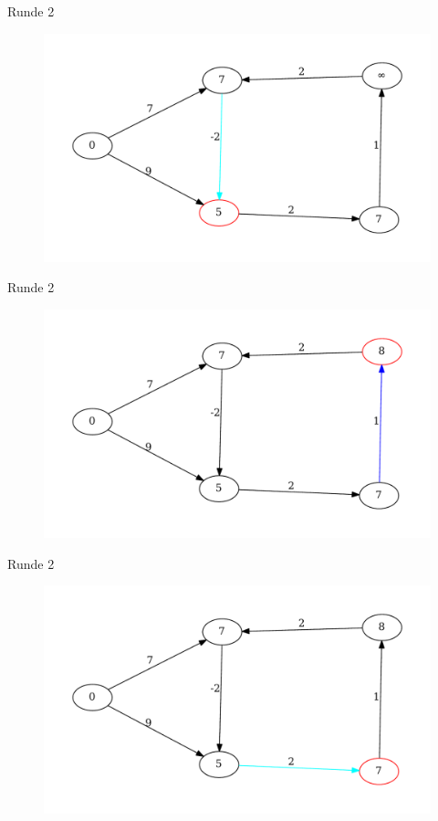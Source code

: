\begin{frame}{Runde 2}
\begin{figure}[htbp]
\centering
\includegraphics[width=\linewidth]{bellman_ford_graphs/graph_10.pdf}
\end{figure}
\end{frame}

\begin{frame}{Runde 2}
\begin{figure}[htbp]
\centering
\includegraphics[width=\linewidth]{bellman_ford_graphs/graph_11.pdf}
\end{figure}
\end{frame}

\begin{frame}{Runde 2}
\begin{figure}[htbp]
\centering
\includegraphics[width=\linewidth]{bellman_ford_graphs/graph_12.pdf}
\end{figure}
\end{frame}

